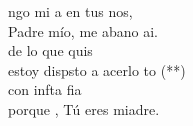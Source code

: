 \begin{cancion}%
	ngo mi a en tus nos,\\
	Padre mío, me abano ai.\\
	 de  lo que quis\\
	estoy dispsto a acerlo to (**)\\
	con infta fia\\
	porque , Tú eres miadre. \\
\end{cancion}%
